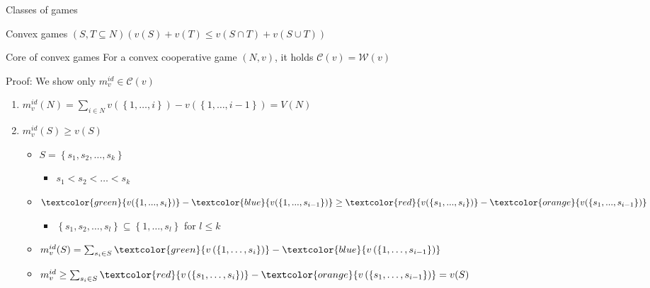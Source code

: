 \documentclass{beamer}
\begin{document}


\begin{frame}{Classes of games}
    \begin{block}{Convex games}
		$\left(S,T \subseteq N\right)\left(v(S)+v(T) \leq v\left(S \cap T\right)+v\left(S \cup T\right)\right)$
	\end{block}
	\pause
	\begin{block}{Core of convex games}
		\pause
		For a convex cooperative game $(N,v)$, it holds $\mathcal{C}(v)=\mathcal{W}(v)$
	\end{block}
	\pause
	Proof: We show only $m^{id}_v \in \mathcal{C}(v)$
	\begin{enumerate}
		\item<5-> $m^{id}_v(N)=\sum_{i \in N} v \left(\left\{1,\dots,i\right\}\right)-v \left(\left\{1,\dots,i-1\right\}\right)=V(N)$
		\item<6-> $m^{id}_v(S) \geq v(S)$
		\begin{itemize}
			\item<7-> $S=\left\{s_1,s_2,\dots,s_k\right\}$
			\begin{itemize}
				\item<7-> $s_1<s_2<\dots<s_k$
			\end{itemize}
			\item<8-> $\textcolor{green}{v (\left\{1,...,s_i\right\})}-\textcolor{blue}{v (\left\{1,...,s_{i-1}\right\})} \geq \textcolor{red}{v (\left\{s_1,...,s_i\right\})}-\textcolor{orange}{v (\left\{s_1,...,s_{i-1}\right\})}$
			\begin{itemize}
				\item<8-> $\left\{s_1,s_2,\dots,s_l\right\} \subseteq \left\{1,\dots,s_l\right\}$ for $l \leq k$
			\end{itemize}
			\item<9-> $m^{id}_v(S)=\sum_{s_i \in S} \textcolor{green}{v \left(\left\{1,\dots,s_i\right\}\right)} - \textcolor{blue}{v \left(\left\{1,\dots,s_{i-1}\right\}\right)}$
			\item<10-> $m^{id}_v \geq \sum_{s_i \in S} \textcolor{red}{v \left(\left\{s_1,\dots,s_i\right\}\right)}-\textcolor{orange}{v \left(\left\{s_1,\dots,s_{i-1}\right\}\right)}=v(S)$
		\end{itemize}
	\end{enumerate}
\end{frame}

\end{document}

